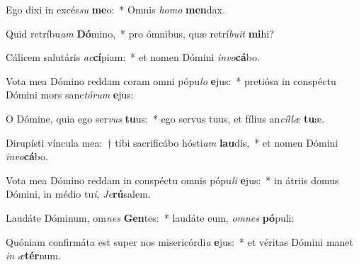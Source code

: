 \item Ego dixi in excés\textit{su} \textbf{me}o:~* Omnis \textit{ho}\textit{mo} \textbf{men}dax.
\item Quid retríbu\textit{am} \textbf{Dó}mino,~* pro ómnibus, quæ retrí\textit{bu}\textit{it} \textbf{mi}hi?
\item Cálicem salutáris \textit{ac}\textbf{cí}piam:~* et nomen Dómini \textit{in}\textit{vo}\textbf{cá}bo.
\item Vota mea Dómino reddam coram omni pópu\textit{lo} \textbf{e}jus:~* pretiósa in conspéctu Dómini mors sanc\textit{tó}\textit{rum} \textbf{e}jus:
\item O Dómine, quia ego ser\textit{vus} \textbf{tu}us:~* ego servus tuus, et fílius an\textit{cíl}\textit{læ} \textbf{tu}æ.
\item Dirupísti víncula mea:~† tibi sacrificábo hósti\textit{am} \textbf{lau}dis,~* et nomen Dómini \textit{in}\textit{vo}\textbf{cá}bo.
\item Vota mea Dómino reddam in conspéctu omnis pópu\textit{li} \textbf{e}jus:~* in átriis domus Dómini, in médio tu\textit{i}, \textit{Je}\textbf{rú}salem.
\item Laudáte Dóminum, om\textit{nes} \textbf{Gen}tes:~* laudáte eum, \textit{om}\textit{nes} \textbf{pó}puli:
\item Quóniam confirmáta est super nos misericórdi\textit{a} \textbf{e}jus:~* et véritas Dómini manet \textit{in} \textit{æ}\textbf{tér}num.
